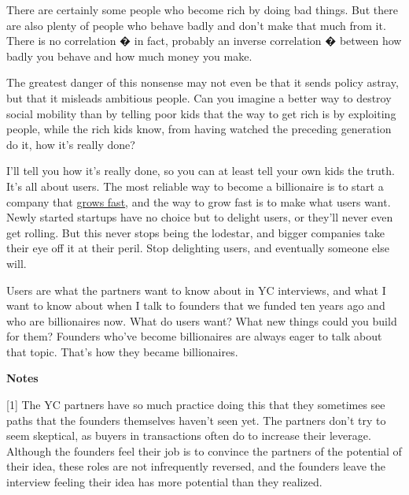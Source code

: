 There are certainly some people who become
                  rich by doing bad things. But there are also plenty of people
                  who behave badly and don't make that much from it. There is no
                  correlation � in fact, probably an inverse correlation �
                  between how badly you behave and how much money you make.

The
                  greatest danger of this nonsense may not even be that it sends
                  policy astray, but that it misleads ambitious people. Can you
                  imagine a better way to destroy social mobility than by
                  telling poor kids that the way to get rich is by exploiting
                  people, while the rich kids know, from having watched the
                  preceding generation do it, how it's really done?

I'll
                  tell you how it's really done, so you can at least tell your
                  own kids the truth. It's all about users. The most reliable
                  way to become a billionaire is to start a company that
                  \href{http://www.paulgraham.com/growth.html}{\underline{grows fast}}, and the way to grow fast is to make what users want. Newly
                  started startups have no choice but to delight users, or
                  they'll never even get rolling. But this never stops being the
                  lodestar, and bigger companies take their eye off it at their
                  peril. Stop delighting users, and eventually someone else
                  will.

Users are what the partners want to know
                  about in YC interviews, and what I want to know about when I
                  talk to founders that we funded ten years ago and who are
                  billionaires now. What do users want? What new things could
                  you build for them? Founders who've become billionaires are
                  always eager to talk about that topic. That's how they became
                  billionaires.









\textbf{Notes}

[1] The YC partners have so much practice doing this that they
                  sometimes see paths that the founders themselves haven't seen
                  yet. The partners don't try to seem skeptical, as buyers in
                  transactions often do to increase their leverage. Although the
                  founders feel their job is to convince the partners of the
                  potential of their idea, these roles are not infrequently
                  reversed, and the founders leave the interview feeling their
                  idea has more potential than they realized.

